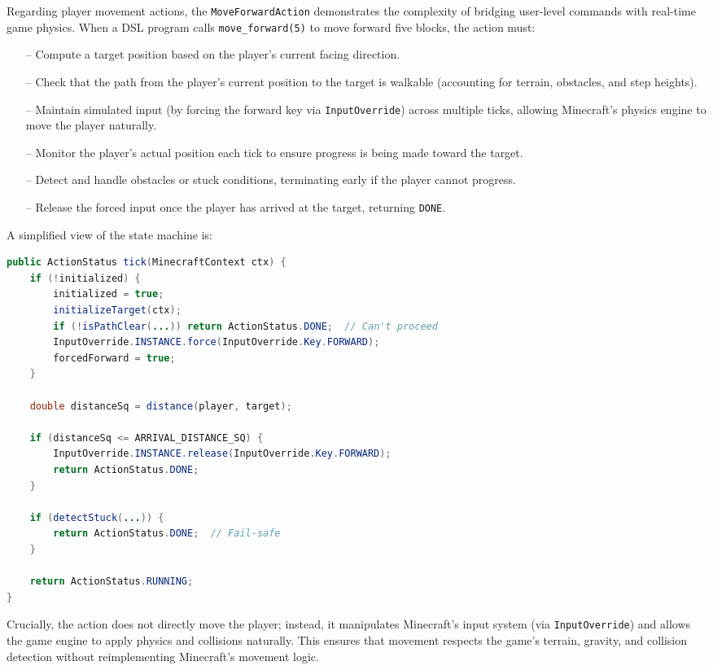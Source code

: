 Regarding player movement actions, the \texttt{MoveForwardAction} demonstrates the complexity of bridging user-level commands with real-time game physics.
When a DSL program calls \texttt{move\_forward(5)} to move forward five blocks, the action must:
\begin{itemize}
\item[--] Compute a target position based on the player's current facing direction.
\item[--] Check that the path from the player's current position to the target is walkable (accounting for terrain, obstacles, and step heights).
\item[--] Maintain simulated input (by forcing the forward key via \texttt{InputOverride}) across multiple ticks, allowing Minecraft's physics engine to move the player naturally.
\item[--] Monitor the player's actual position each tick to ensure progress is being made toward the target.
\item[--] Detect and handle obstacles or stuck conditions, terminating early if the player cannot progress.
\item[--] Release the forced input once the player has arrived at the target, returning \texttt{DONE}.
\end{itemize}

A simplified view of the state machine is:

\begin{lstlisting}[language=Java]
public ActionStatus tick(MinecraftContext ctx) {
    if (!initialized) {
        initialized = true;
        initializeTarget(ctx);
        if (!isPathClear(...)) return ActionStatus.DONE;  // Can't proceed
        InputOverride.INSTANCE.force(InputOverride.Key.FORWARD);
        forcedForward = true;
    }

    double distanceSq = distance(player, target);

    if (distanceSq <= ARRIVAL_DISTANCE_SQ) {
        InputOverride.INSTANCE.release(InputOverride.Key.FORWARD);
        return ActionStatus.DONE;
    }

    if (detectStuck(...)) {
        return ActionStatus.DONE;  // Fail-safe
    }

    return ActionStatus.RUNNING;
}
\end{lstlisting}

Crucially, the action does not directly move the player; instead, it manipulates Minecraft's input system (via \texttt{InputOverride}) and allows the game engine to apply physics and collisions naturally.
This ensures that movement respects the game's terrain, gravity, and collision detection without reimplementing Minecraft's movement logic.

